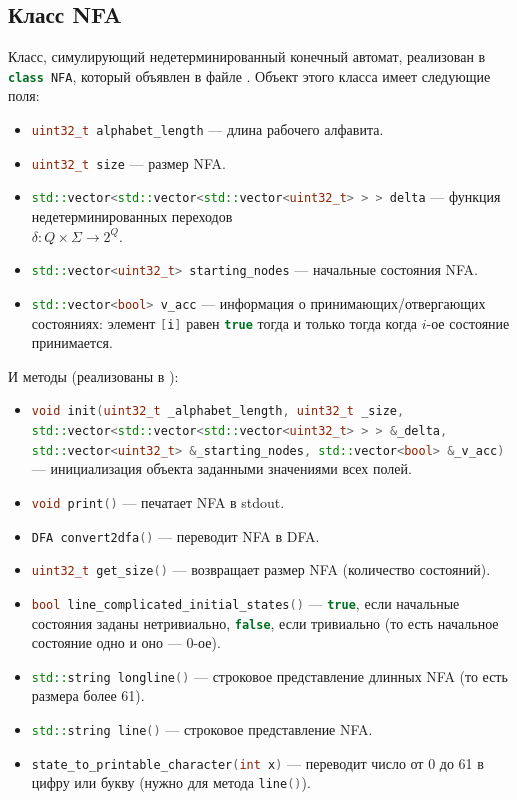 \documentclass{article}
\begin{document}
\subsection{Класс NFA}
Класс, симулирующий недетерминированный конечный автомат, реализован в \lstinline[language=C++]!class NFA!, который объявлен в файле . Объект этого класса имеет следующие поля:
\begin{itemize}
  \item \lstinline[language=C++]!uint32_t alphabet_length! --- длина рабочего алфавита.
  \item \lstinline[language=C++]!uint32_t size! --- размер NFA.
  \item \lstinline[language=C++]!std::vector<std::vector<std::vector<uint32_t> > > delta! --- функция недетерминированных переходов\\ $\delta: Q \times \Sigma \rightarrow 2^Q$.
  \item \lstinline[language=C++]!std::vector<uint32_t> starting_nodes! --- начальные состояния NFA.
  \item \lstinline[language=C++]!std::vector<bool> v_acc! --- информация о принимающих/отвергающих состояниях: элемент \lstinline[language=C++]![i]! равен \lstinline[language=C++]!true! тогда и только тогда когда $i$-ое состояние принимается.
\end{itemize}
И методы (реализованы в ):
\begin{itemize}
  \item[\ding{228}] \lstinline[language=C++]!void init(uint32_t _alphabet_length, uint32_t _size, std::vector<std::vector<std::vector<uint32_t> > > &_delta, std::vector<uint32_t> &_starting_nodes, std::vector<bool> &_v_acc)! --- инициализация объекта заданными значениями всех полей.
  \item[\ding{228}] \lstinline[language=C++]!void print()! --- печатает NFA в stdout.
  \item[\ding{228}] \lstinline[language=C++]!DFA convert2dfa()! --- переводит NFA в DFA.
  \item[\ding{228}] \lstinline[language=C++]!uint32_t get_size()! --- возвращает размер NFA (количество состояний).
  \item[\ding{228}] \lstinline[language=C++]!bool line_complicated_initial_states()! --- \lstinline[language=C++]!true!, если начальные состояния заданы нетривиально, \lstinline[language=C++]!false!, если тривиально (то есть начальное состояние одно и оно --- 0-ое).
  \item[\ding{228}] \lstinline[language=C++]!std::string longline()! --- строковое представление длинных NFA (то есть размера более 61).
  \item[\ding{228}] \lstinline[language=C++]!std::string line()! --- строковое представление NFA.
  \item[\ding{228}] \lstinline[language=C++]!state_to_printable_character(int x)! --- переводит число от 0 до 61 в цифру или букву (нужно для метода \lstinline[language=C++]!line()!).
\end{itemize}
\end{document}
